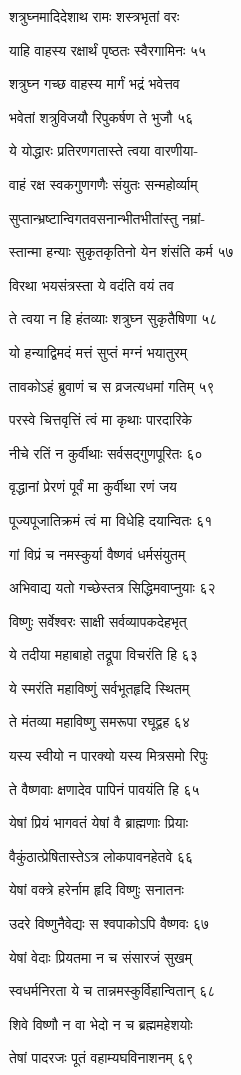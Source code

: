 शत्रुघ्नमादिदेशाथ रामः शस्त्रभृतां वरः

याहि वाहस्य रक्षार्थं पृष्ठतः स्वैरगामिनः ५५

शत्रुघ्न गच्छ वाहस्य मार्गं भद्रं भवेत्तव

भवेतां शत्रुविजयौ रिपुकर्षण ते भुजौ ५६

ये योद्धारः प्रतिरणगतास्ते त्वया वारणीया-

वाहं रक्ष स्वकगुणगणैः संयुतः सन्महोर्व्याम्

सुप्तान्भ्रष्टान्विगतवसनान्भीतभीतांस्तु नम्रां-

स्तान्मा हन्याः सुकृतकृतिनो येन शंसंति कर्म ५७

विरथा भयसंत्रस्ता ये वदंति वयं तव

ते त्वया न हि हंतव्याः शत्रुघ्न सुकृतैषिणा ५८

यो हन्याद्विमदं मत्तं सुप्तं मग्नं भयातुरम्

तावकोऽहं ब्रुवाणं च स व्रजत्यधमां गतिम् ५९

परस्वे चित्तवृत्तिं त्वं मा कृथाः पारदारिके

नीचे रतिं न कुर्वीथाः सर्वसद्गुणपूरितः ६०

वृद्धानां प्रेरणं पूर्वं मा कुर्वीथा रणं जय

पूज्यपूजातिक्रमं त्वं मा विधेहि दयान्वितः ६१

गां विप्रं च नमस्कुर्या वैष्णवं धर्मसंयुतम्

अभिवाद्य यतो गच्छेस्तत्र सिद्धिमवाप्नुयाः ६२

विष्णुः सर्वेश्वरः साक्षी सर्वव्यापकदेहभृत्

ये तदीया महाबाहो तद्रूपा विचरंति हि ६३

ये स्मरंति महाविष्णुं सर्वभूतहृदि स्थितम्

ते मंतव्या महाविष्णु समरूपा रघूद्वह ६४

यस्य स्वीयो न पारक्यो यस्य मित्रसमो रिपुः

ते वैष्णवाः क्षणादेव पापिनं पावयंति हि ६५

येषां प्रियं भागवतं येषां वै ब्राह्मणाः प्रियाः

वैकुंठात्प्रेषितास्तेऽत्र लोकपावनहेतवे ६६

येषां वक्त्रे हरेर्नाम हृदि विष्णुः सनातनः

उदरे विष्णुनैवेद्यः स श्वपाकोऽपि वैष्णवः ६७

येषां वेदाः प्रियतमा न च संसारजं सुखम्

स्वधर्मनिरता ये च तान्नमस्कुर्विहान्वितान् ६८

शिवे विष्णौ न वा भेदो न च ब्रह्ममहेशयोः

तेषां पादरजः पूतं वहाम्यघविनाशनम् ६९

